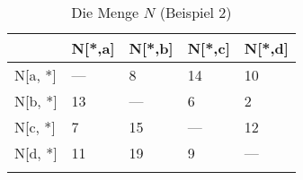 
\begin{longtable}[c]{|l|l|l|l|l|}
\hline
            & N{[}*,a{]} & N{[}*,b{]} & N{[}*,c{]} & N{[}*,d{]} \\ \hline
\endfirsthead
%
\endhead
%
N{[}a, *{]} & ---        & 8          & 14         & 10         \\ \hline
N{[}b, *{]} & 13         & ---        & 6          & 2          \\ \hline
N{[}c, *{]} & 7          & 15         & ---        & 12         \\ \hline
N{[}d, *{]} & 11         & 19         & 9          & ---        \\ \hline
\caption{Die Menge $N$ (Beispiel 2)}
\label{beispiel2N}\\
\end{longtable}